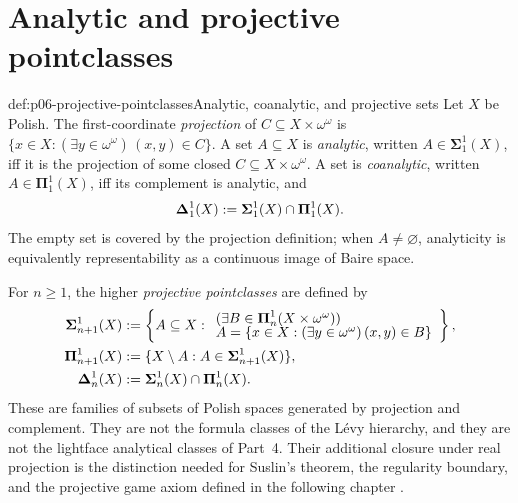 \section{Analytic and projective pointclasses}
\label{sec:p06-projective-pointclasses}

\begin{hbdefinition}{def:p06-projective-pointclasses}{Analytic, coanalytic, and projective sets}
Let \(X\) be Polish.  The first-coordinate \emph{projection} of
\(C\subseteq X\times\omega^\omega\) is
\(\{x\in X:(\exists y\in\omega^\omega)\,(x,y)\in C\}\).  A set
\(A\subseteq X\) is \emph{analytic}, written
\(A\in\boldsymbol{\Sigma}^{1}_{1}(X)\), iff it is the projection of some
closed \(C\subseteq X\times\omega^\omega\).  A set is \emph{coanalytic}, written
\(A\in\boldsymbol{\Pi}^{1}_{1}(X)\), iff its complement is analytic, and
\[
  \boldsymbol{\Delta}^{1}_{1}(X)
  \mathrel{:=}
  \boldsymbol{\Sigma}^{1}_{1}(X)
  \cap
  \boldsymbol{\Pi}^{1}_{1}(X).
\]
The empty set is covered by the projection definition; when \(A\ne\varnothing\),
analyticity is equivalently representability as a continuous image of Baire
space.

For \(n\geq1\), the higher \emph{projective pointclasses} are defined by
\[
\begin{aligned}
  \boldsymbol{\Sigma}^{1}_{n+1}(X)
    &\mathrel{:=}
      \left\{A\subseteq X:
        \begin{array}{l}
        (\exists B\in\boldsymbol{\Pi}^{1}_{n}
          (X\times\omega^\omega))\\[-2pt]
        A=\{x\in X:(\exists y\in\omega^\omega)\,(x,y)\in B\}
        \end{array}\right\},\\
  \boldsymbol{\Pi}^{1}_{n+1}(X)
    &\mathrel{:=}
      \{X\setminus A:A\in
        \boldsymbol{\Sigma}^{1}_{n+1}(X)\},\\
  \boldsymbol{\Delta}^{1}_{n}(X)
    &\mathrel{:=}
      \boldsymbol{\Sigma}^{1}_{n}(X)
      \cap\boldsymbol{\Pi}^{1}_{n}(X).
\end{aligned}
\]
These are families of subsets of Polish spaces generated by projection and
complement.  They are not the formula classes of the L\'evy hierarchy, and
they are not the lightface analytical classes of Part~4.  Their additional
closure under real projection is the distinction needed for Suslin's theorem,
the regularity boundary, and the projective game axiom defined in the
following chapter
\cite[Sections~25, 37]{Kechris1995}.
\end{hbdefinition}

